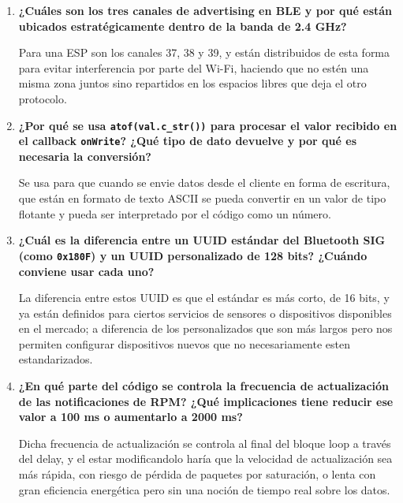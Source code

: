 \documentclass[12pt, letterpaper]{article}
\begin{document}
\begin{enumerate}[leftmargin=1.5cm, label=\textbf{P\arabic*.}]

  \item \textbf{¿Cuáles son los tres canales de advertising en BLE y por qué
        están ubicados estratégicamente dentro de la banda de 2.4 GHz?}

Para una ESP son los canales 37, 38 y 39, y están distribuidos de esta forma para evitar interferencia por parte del Wi-Fi, haciendo que no estén una misma zona juntos sino repartidos en los espacios libres que deja el otro protocolo.
\\

  \item \textbf{¿Por qué se usa \texttt{atof(val.c\_str())} para procesar
        el valor recibido en el callback \texttt{onWrite}? ¿Qué tipo de dato
        devuelve y por qué es necesaria la conversión?}

Se usa para que cuando se envie datos desde el cliente en forma de escritura, que están en formato de texto ASCII se pueda convertir en un valor de tipo flotante y pueda ser interpretado por el código como un número.
\\

  \item \textbf{¿Cuál es la diferencia entre un UUID estándar del Bluetooth SIG
        (como \texttt{0x180F}) y un UUID personalizado de 128 bits? ¿Cuándo
        conviene usar cada uno?}

La diferencia entre estos UUID es que el estándar es más corto, de 16 bits, y ya están definidos para ciertos servicios de sensores o dispositivos disponibles en el mercado; a diferencia de los personalizados que son más largos pero nos permiten configurar dispositivos nuevos que no necesariamente esten estandarizados.
\\
  \item \textbf{¿En qué parte del código se controla la frecuencia de
        actualización de las notificaciones de RPM? ¿Qué implicaciones tiene
        reducir ese valor a 100 ms o aumentarlo a 2000 ms?}

Dicha frecuencia de actualización se controla al final del bloque loop a través del delay, y el estar modificandolo haría que la velocidad de actualización sea más rápida, con riesgo de pérdida de paquetes por saturación, o lenta con gran eficiencia energética pero sin una noción de tiempo real sobre los datos.
\\


\end{enumerate}
\end{document}
